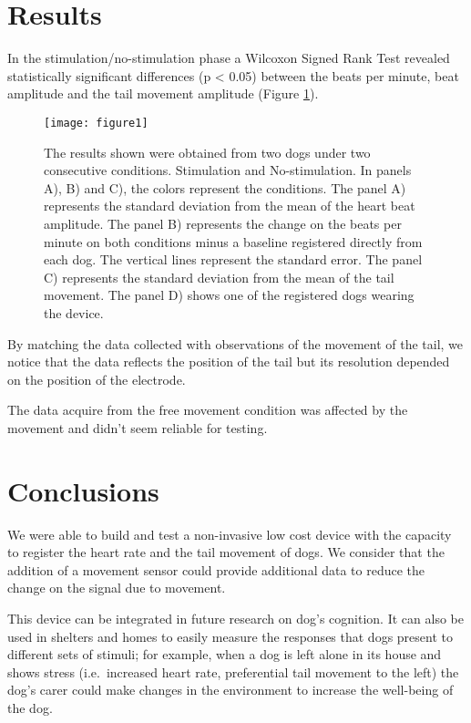 \documentclass[twocolumn]{bmcart}%
\begin{document}
\section{Results}\label{results}

In the stimulation/no-stimulation phase a Wilcoxon Signed Rank Test
revealed statistically significant differences (p \textless{} 0.05)
between the beats per minute, beat amplitude and the tail movement
amplitude (Figure \ref{centfig}).

\begin{figure}[h!]
  \texttt{[image: figure1]}
  \caption{\label{centfig}
The results shown were obtained from two dogs under two consecutive conditions. Stimulation and No-stimulation. In panels A), B) and C), the colors represent the conditions. The panel A) represents the standard deviation from the mean of the heart beat amplitude. The panel B) represents the change on the beats per minute on both conditions minus a baseline registered directly from each dog. The vertical lines represent the standard error. The panel C) represents the standard deviation from the mean of the tail movement. The panel D) shows one of the registered dogs wearing the device.
}
\end{figure}

By matching the data collected with observations of the movement of the
tail, we notice that the data reflects the position of the tail but its
resolution depended on the position of the electrode.

The data acquire from the free movement condition was affected by the
movement and didn't seem reliable for testing.

\section{Conclusions}\label{conclusions}

We were able to build and test a non-invasive low cost device with the
capacity to register the heart rate and the tail movement of dogs. We
consider that the addition of a movement sensor could provide additional
data to reduce the change on the signal due to movement.

This device can be integrated in future research on dog's cognition. It
can also be used in shelters and homes to easily measure the responses
that dogs present to different sets of stimuli; for example, when a dog
is left alone in its house and shows stress (i.e.~increased heart rate,
preferential tail movement to the left) the dog's carer could make
changes in the environment to increase the well-being of the dog.
\end{document}
